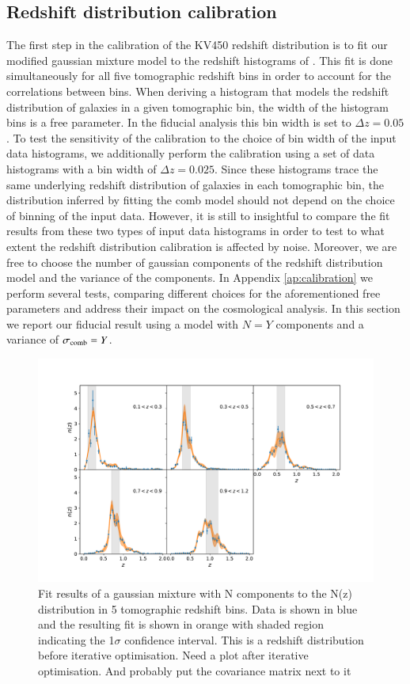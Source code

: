 \documentclass{aa}
\begin{document}
\subsection{Redshift distribution calibration}
\label{sec:redshift_calibration}
The first step in the calibration of the KV450 redshift distribution is to fit our modified gaussian mixture model to the redshift histograms of \cite{hildebrandt18}. This fit is done simultaneously for all five tomographic redshift bins in order to account for the correlations between bins. When deriving a histogram that models the redshift distribution of galaxies in a given tomographic bin, the width of the histogram bins is a free parameter. In the fiducial analysis this bin width is set to $\Delta z = 0.05$.  To test the sensitivity of the calibration to the choice of bin width of the input data histograms, we additionally perform the calibration using a set of data histograms with a bin width of $\Delta z = 0.025$.  Since these histograms trace the same underlying redshift distribution of galaxies in each tomographic bin, the distribution inferred by fitting the comb model should not depend on the choice of binning of the input data. However, it is still to insightful to compare the fit results from these two types of input data histograms in order to test to what extent the redshift distribution calibration is affected by noise. Moreover, we are free to choose the number of gaussian components of the redshift distribution model and the variance of the components. In Appendix \ref{ap:calibration} we perform several tests, comparing different choices for the aforementioned free parameters and address their impact on the cosmological analysis. In this section we report our fiducial result using a model with $N = Y$ components and a variance of $\sigma_{\rm comb} = Y$. 
\begin{figure}
\centering
\includegraphics[width=\linewidth]{plots/combfit_linear.pdf}
\caption{Fit results of a gaussian mixture with N components to the N(z) distribution in 5 tomographic redshift bins. Data is shown in blue and the resulting fit is shown in orange with shaded region indicating the 1$\sigma$ confidence interval. {\color{red} This is a redshift distribution before iterative optimisation. Need a plot after iterative optimisation. And probably put the covariance matrix next to it}}
\label{fig:comb}
\end{figure}
\end{document}
